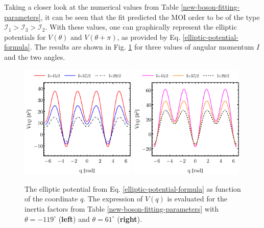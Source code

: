Taking a closer look at the numerical values from Table \ref{new-boson-fitting-parameters}, it can be seen that the fit predicted the MOI order to be of the type $\mathcal{I}_1>\mathcal{I}_3>\mathcal{I}_2$. With these values, one can graphically represent the elliptic potentials for $V(\theta)$ and $V(\theta+\pi)$, as provided by Eq. \ref{elliptic-potential-formula}. The results are shown in Fig. \ref{elliptic-potential-theta} for three values of angular momentum $I$ and the two angles.
\begin{figure}[b] %
    \centering
    \includegraphics[width=0.49\textwidth]{Chapters/Figures/potential-fit-theta.pdf}
    \includegraphics[width=0.49\textwidth]{Chapters/Figures/potential-fit-theta-pi.pdf}
    \caption{The elliptic potential from Eq. \ref{elliptic-potential-formula} as function of the coordinate $q$. The expression of $V(q)$ is evaluated for the inertia factors from Table \ref{new-boson-fitting-parameters} with $\theta=-119^\circ$ (\textbf{left}) and $\theta=61^\circ$ (\textbf{right}).}
    \label{elliptic-potential-theta}
\end{figure}

